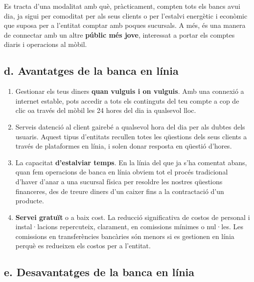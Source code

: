 Es tracta d'una modalitat amb què, pràcticament, compten tots els bancs avui dia, ja sigui per comoditat per als seus clients o per l'estalvi energètic i econòmic que suposa per a l'entitat comptar amb poques sucursals. A més, és una manera de connectar amb un altre \textbf{públic més jove}, interessat a portar els comptes diaris i operacions al mòbil.


\subsection*{d. Avantatges de la banca en línia}


\begin{enumerate}
    \item Gestionar els teus diners \textbf{quan vulguis i on vulguis}. Amb una connexió a internet estable, pots accedir a tots els continguts del teu compte a cop de clic oa través del mòbil les 24 hores del dia ia qualsevol lloc.
    \item Serveis datenció al client gairebé a qualsevol hora del dia per als dubtes dels usuaris. Aquest tipus d'entitats recullen totes les qüestions dels seus clients a través de plataformes en línia, i solen donar resposta en qüestió d'hores.
    \item La capacitat \textbf{d'estalviar temps}. En la línia del que ja s'ha comentat abans, quan fem operacions de banca en línia obviem tot el procés tradicional d'haver d'anar a una sucursal física per resoldre les nostres qüestions financeres, des de treure diners d'un caixer fins a la contractació d'un producte.
    \item \textbf{Servei gratuït} o a baix cost. La reducció significativa de costos de personal i instal·lacions repercuteix, clarament, en comissions mínimes o nul·les. Les comissions en transferències bancàries són menors si es gestionen en línia perquè es redueixen els costos per a l'entitat.
\end{enumerate}




\subsection*{e. Desavantatges de la banca en línia}

